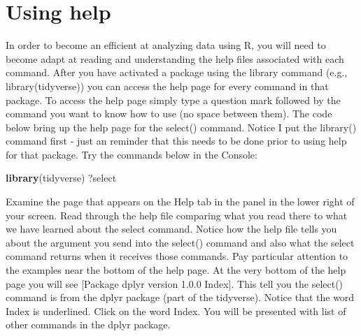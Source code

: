 \documentclass[
]{krantz}
\makeatletter
\newenvironment{Shaded}{\begin{snugshade}}{\end{snugshade}}
\newcommand{\DataTypeTok}[1]{\textcolor[rgb]{0.27,0.27,0.27}{#1}}
\newcommand{\KeywordTok}[1]{\textcolor[rgb]{0.27,0.27,0.27}{\textbf{#1}}}
\newcommand{\NormalTok}[1]{#1}
\newcommand{\OperatorTok}[1]{\textcolor[rgb]{0.43,0.43,0.43}{\textbf{#1}}}
\newcommand{\StringTok}[1]{\textcolor[rgb]{0.5,0.5,0.5}{#1}}
\newenvironment{kframe}{%
\medskip{}
\setlength{\fboxsep}{.8em}
 \def\at@end@of@kframe{}%
 \ifinner\ifhmode%
  \def\at@end@of@kframe{\end{minipage}}%
  \begin{minipage}{\columnwidth}%
 \fi\fi%
 \def\FrameCommand##1{\hskip\@totalleftmargin \hskip-\fboxsep
 \colorbox{shadecolor}{##1}\hskip-\fboxsep
     \hskip-\linewidth \hskip-\@totalleftmargin \hskip\columnwidth}%
 \MakeFramed {\advance\hsize-\width
   \@totalleftmargin\z@ \linewidth\hsize
   \@setminipage}}%
 {\par\unskip\endMakeFramed%
 \at@end@of@kframe}
\renewenvironment{Shaded}{\begin{kframe}}{\end{kframe}}
\makeatother
\begin{document}
\begin{Shaded}
\end{Shaded}

\hypertarget{using-help}{%
\section{Using help}\label{using-help}}

In order to become an efficient at analyzing data using R, you will need to become adapt at reading and understanding the help files associated with each command. After you have activated a package using the library command (e.g., library(tidyverse)) you can access the help page for every command in that package. To access the help page simply type a question mark followed by the command you want to know how to use (no space between them). The code below bring up the help page for the select() command. Notice I put the library() command first - just an reminder that this needs to be done prior to using help for that package. Try the commands below in the Console:

\begin{Shaded}
\begin{Highlighting}[]
\KeywordTok{library}\NormalTok{(tidyverse)}
\NormalTok{?select}
\end{Highlighting}
\end{Shaded}

Examine the page that appears on the Help tab in the panel in the lower right of your screen. Read through the help file comparing what you read there to what we have learned about the select command. Notice how the help file tells you about the argument you send into the select() command and also what the select command returns when it receives those commands. Pay particular attention to the examples near the bottom of the help page. At the very bottom of the help page you will see {[}Package dplyr version 1.0.0 Index{]}. This tell you the select() command is from the dplyr package (part of the tidyverse). Notice that the word Index is underlined. Click on the word Index. You will be presented with list of other commands in the dplyr package.
\end{document}
